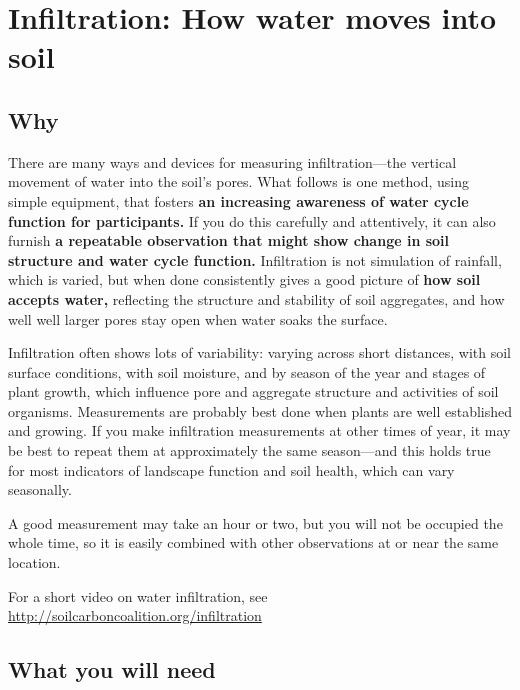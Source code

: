 \documentclass[11pt,letterpaper,twoside,onecolumn]{memoir}
\begin{document}
\chapter{Infiltration: How water moves into soil}

\section*{Why} 

There are many ways and devices for measuring infiltration---the vertical movement of water into the soil's pores. What follows is one method, using simple equipment, that fosters \textbf{an increasing awareness of water cycle function for participants.} If you do this carefully and attentively, it can also furnish \textbf{a repeatable observation that might show change in soil structure and water cycle function.} Infiltration is not simulation of rainfall, which is varied, but when done consistently gives a good picture of \textbf{how soil accepts water,} reflecting the structure and stability of soil aggregates, and how well well larger pores stay open when water soaks the surface.

Infiltration often shows lots of variability: varying across short distances, with soil surface conditions, with soil moisture, and by season of the year and stages of plant growth, which influence pore and aggregate structure and activities of soil organisms. Measurements are probably best done when plants are well established and growing. If you make infiltration measurements at other times of year, it may be best to repeat them at approximately the same season---and this holds true for most indicators of landscape function and soil health, which can vary seasonally.

A good measurement may take an hour or two, but you will not be occupied the whole time, so it is easily combined with other observations at or near the same location.

For a short video on water infiltration, see \url{http://soilcarboncoalition.org/infiltration}


\section*{What you will need}
\end{document}
